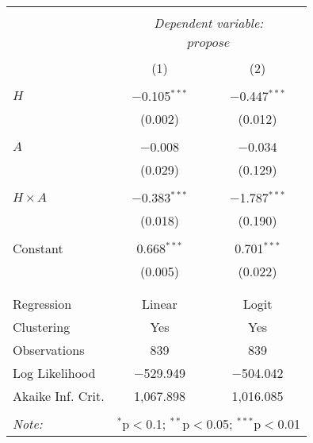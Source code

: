 
\begin{tabular}{@{\extracolsep{5pt}}lcc} 
\\[-1.8ex]\hline 
\hline \\[-1.8ex] 
 & \multicolumn{2}{c}{\textit{Dependent variable:}} \\ 
\cline{2-3} 
\\[-1.8ex] & \multicolumn{2}{c}{$propose$} \\ 
\\[-1.8ex] & (1) & (2)\\ 
\hline \\[-1.8ex] 
 $H$ & $-$0.105$^{***}$ & $-$0.447$^{***}$ \\ 
  & (0.002) & (0.012) \\ 
  & & \\ 
 $A$ & $-$0.008 & $-$0.034 \\ 
  & (0.029) & (0.129) \\ 
  & & \\ 
 $H\times A$ & $-$0.383$^{***}$ & $-$1.787$^{***}$ \\ 
  & (0.018) & (0.190) \\ 
  & & \\ 
 Constant & 0.668$^{***}$ & 0.701$^{***}$ \\ 
  & (0.005) & (0.022) \\ 
  & & \\ 
\hline \\[-1.8ex] 
Regression & Linear & Logit \\ 
Clustering & Yes & Yes \\ 
Observations & 839 & 839 \\ 
Log Likelihood & $-$529.949 & $-$504.042 \\ 
Akaike Inf. Crit. & 1,067.898 & 1,016.085 \\ 
\hline 
\hline \\[-1.8ex] 
\textit{Note:}  & \multicolumn{2}{r}{$^{*}$p$<$0.1; $^{**}$p$<$0.05; $^{***}$p$<$0.01} \\ 
\end{tabular} 
